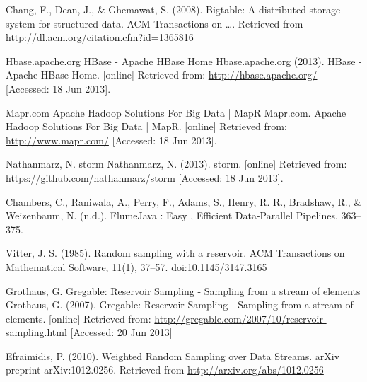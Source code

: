\documentclass{article}
\begin{document}
\begin{thebibliography}{99}
     Chang, F., Dean, J., \& Ghemawat, S. (2008). Bigtable: A
        distributed storage system for structured data. ACM Transactions on ….
        Retrieved from http://dl.acm.org/citation.cfm?id=1365816

     Hbase.apache.org
        HBase - Apache HBase Home
        Hbase.apache.org (2013). HBase - Apache HBase Home. [online]
        Retrieved from: \url{http://hbase.apache.org/} [Accessed: 18 Jun 2013].

     Mapr.com
        Apache Hadoop Solutions For Big Data | MapR
        Mapr.com. Apache Hadoop Solutions For Big Data | MapR. [online]
        Retrieved from: \url{http://www.mapr.com/} [Accessed: 18 Jun 2013].

     Nathanmarz, N.
        storm
        Nathanmarz, N. (2013). storm. [online] Retrieved from:
        \url{https://github.com/nathanmarz/storm} [Accessed: 18 Jun 2013].

     Chambers, C., Raniwala, A., Perry, F., Adams, S., Henry, R.
        R., Bradshaw, R., \& Weizenbaum, N. (n.d.). FlumeJava : Easy , Efficient
        Data-Parallel Pipelines, 363–375.

     Vitter, J. S. (1985). Random sampling with a reservoir.
        ACM Transactions on Mathematical Software, 11(1), 37–57.
        doi:10.1145/3147.3165

     Grothaus, G.
        Gregable: Reservoir Sampling - Sampling from a stream of elements
        Grothaus, G. (2007). Gregable: Reservoir Sampling - Sampling from a
        stream of elements. [online] Retrieved from:
        \url{http://gregable.com/2007/10/reservoir-sampling.html} [Accessed: 20 Jun
        2013]

     Efraimidis, P. (2010). Weighted Random Sampling over
        Data Streams. arXiv preprint arXiv:1012.0256. Retrieved from
        \url{http://arxiv.org/abs/1012.0256}
\end{thebibliography}
\end{document}
